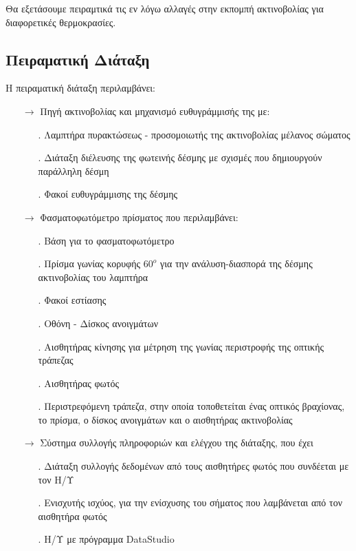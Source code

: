 \documentclass[a4paper]{article}
\begin{document}
Θα εξετάσουμε πειραμτικά τις εν λόγω αλλαγές στην εκπομπή ακτινοβολίας για διαφορετικές θερμοκρασίες.

\subsection*{Πειραματική Διάταξη}
Η πειραματική διάταξη περιλαμβάνει: 
\begin{itemize}
\item[$\rightarrow$] Πηγή ακτινοβολίας και μηχανισμό ευθυγράμμισής της με:
	\begin{itemize}
		\item[.] Λαμπτήρα πυρακτώσεως - προσομοιωτής της ακτινοβολίας μέλανος σώματος 
		\item[.] Διάταξη διέλευσης της φωτεινής δέσμης με σχισμές που δημιουργούν παράλληλη δέσμη
		\item[.] Φακοί ευθυγράμμισης της δέσμης
	\end{itemize}	
\item[$\rightarrow$] Φασματοφωτόμετρο πρίσματος που περιλαμβάνει: 
	\begin{itemize}
		\item[.] Βάση για το φασματοφωτόμετρο 
		\item[.] Πρίσμα γωνίας κορυφής $60^o$ για την ανάλυση-διασπορά της δέσμης ακτινοβολίας του λαμπτήρα
		\item[.] Φακοί εστίασης 
		\item[.] Οθόνη - Δίσκος ανοιγμάτων 
		\item[.] Αισθητήρας κίνησης για μέτρηση της γωνίας περιστροφής της οπτικής τράπεζας
		\item[.] Αισθητήρας φωτός
		\item[.] Περιστρεφόμενη τράπεζα, στην οποία τοποθετείται ένας οπτικός βραχίονας, το πρίσμα, ο δίσκος 				 				ανοιγμάτων και ο αισθητήρας ακτινοβολίας
	\end{itemize}
\item[$\rightarrow$] Σύστημα συλλογής πληροφοριών και ελέγχου της διάταξης, που έχει 
	\begin{itemize}
		\item[.] Διάταξη συλλογής δεδομένων από τους αισθητήρες φωτός που συνδέεται με τον Η/Υ
		\item[.] Ενισχυτής ισχύος, για την ενίσχυσης του σήματος που λαμβάνεται από τον αισθητήρα φωτός
		\item[.] Η/Υ με πρόγραμμα DataStudio
	\end{itemize}
\end{itemize}
\end{document}
